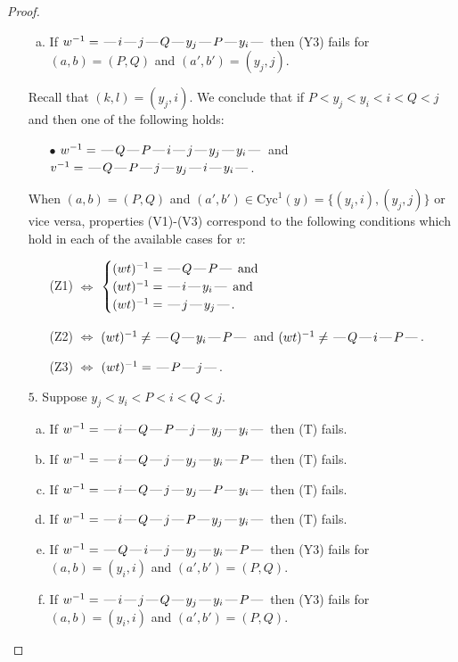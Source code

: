 \documentclass[10pt]{article}
\theoremstyle{definition}
\theoremstyle{definition}
\def\dash{\text{\hspace{0.5mm}---\hspace{0.5mm}}}
\def\Cyc{\mathrm{Cyc}}
\begin{document}
\begin{proof}
\begin{enumerate}
\begin{enumerate}[(a)]
\item If $w^{-1} = \dash i\dash j\dash Q\dash y_j\dash P\dash y_i\dash $ then (Y3) fails for $(a,b)=(P,Q)$ and $(a',b')=(y_j,j)$.
\end{enumerate}
Recall that $(k,l) = (y_j,i)$.
We conclude that if $P < y_j < y_i < i < Q < j$ and then one of the following holds:
\begin{enumerate}
\item[$\bullet$] $w^{-1} = \dash Q\dash P\dash i\dash j\dash y_j\dash y_i\dash $ and $v^{-1} = \dash Q\dash P\dash j\dash y_j\dash i\dash y_i\dash $.
\end{enumerate}
When $(a,b)= (P,Q)$ and $(a',b')\in \Cyc^1(y)=\{(y_i,i),(y_j,j)\}$ or vice versa,
properties (V1)-(V3) correspond to the following conditions which hold in
each of the available cases for $v$:
\begin{enumerate}
\item[](Z1) $\Leftrightarrow$ $\begin{cases}\text{$(wt)^{-1} = \dash Q \dash P \dash$}\text{ and }\\
\text{$(wt)^{-1} = \dash i \dash y_i \dash$}\text{ and }\\
\text{$(wt)^{-1} = \dash j \dash y_j \dash$}.\end{cases}$
\item[](Z2) $\Leftrightarrow$ $(wt)^{-1} \neq \dash Q \dash y_i \dash P \dash$ and $(wt)^{-1}\neq \dash Q \dash i \dash P \dash$.
\item[](Z3) $\Leftrightarrow$ $(wt)^{-1} = \dash P \dash j \dash$.
\end{enumerate}
\item[$5$.] Suppose $y_j < y_i < P < i < Q < j$.
\begin{enumerate}[(a)]
\item If $w^{-1} = \dash i\dash Q\dash P\dash j\dash y_j\dash y_i\dash $ then (T) fails.
\item If $w^{-1} = \dash i\dash Q\dash j\dash y_j\dash y_i\dash P\dash $ then (T) fails.
\item If $w^{-1} = \dash i\dash Q\dash j\dash y_j\dash P\dash y_i\dash $ then (T) fails.
\item If $w^{-1} = \dash i\dash Q\dash j\dash P\dash y_j\dash y_i\dash $ then (T) fails.
\item If $w^{-1} = \dash Q\dash i\dash j\dash y_j\dash y_i\dash P\dash $ then (Y3) fails for $(a,b)=(y_i,i)$ and $(a',b')=(P,Q)$.
\item If $w^{-1} = \dash i\dash j\dash Q\dash y_j\dash y_i\dash P\dash $ then (Y3) fails for $(a,b)=(y_i,i)$ and $(a',b')=(P,Q)$.

\end{enumerate}
\end{enumerate}
\end{proof}
\end{document}
